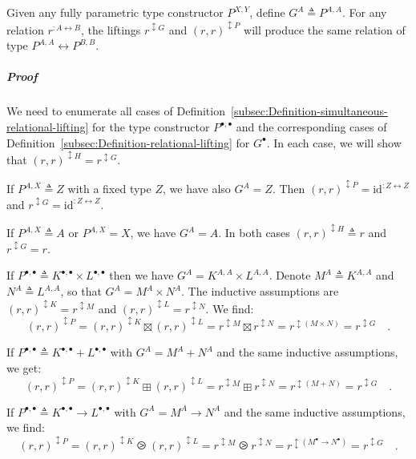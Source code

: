 Given any fully parametric type constructor $P^{X,Y}$, define $G^{A}\triangleq P^{A,A}$.
For any relation $r^{:A\leftrightarrow B}$, the liftings $r^{\updownarrow G}$
and $\left(r,r\right)^{\updownarrow P}$ will produce the same relation
of type $P^{A,A}\leftrightarrow P^{B,B}$.

\subparagraph{Proof}

We need to enumerate all cases of Definition~\ref{subsec:Definition-simultaneous-relational-lifting}
for the type constructor $P^{\bullet,\bullet}$ and the corresponding
cases of Definition~\ref{subsec:Definition-relational-lifting} for
$G^{\bullet}$. In each case, we will show that $(r,r)^{\updownarrow H}=r^{\updownarrow G}$.

If $P^{A,X}\triangleq Z$ with a fixed type $Z$, we have also $G^{A}=Z$.
Then $(r,r)^{\updownarrow P}=\text{id}^{:Z\leftrightarrow Z}$ and
$r^{\updownarrow G}=\text{id}^{:Z\leftrightarrow Z}$.

If $P^{A,X}\triangleq A$ or $P^{A,X}=X$, we have $G^{A}=A$. In
both cases $(r,r)^{\updownarrow H}\triangleq r$ and $r^{\updownarrow G}=r$.

If $P^{\bullet,\bullet}\triangleq K^{\bullet,\bullet}\times L^{\bullet,\bullet}$
then we have $G^{A}=K^{A,A}\times L^{A,A}$. Denote $M^{A}\triangleq K^{A,A}$
and $N^{A}\triangleq L^{A,A}$, so that $G^{A}=M^{A}\times N^{A}$.
The inductive assumptions are $(r,r)^{\updownarrow K}=r^{\updownarrow M}$
and $(r,r)^{\updownarrow L}=r^{\updownarrow N}$. We find:
\[
(r,r)^{\updownarrow P}=(r,r)^{\updownarrow K}\boxtimes(r,r)^{\updownarrow L}=r^{\updownarrow M}\boxtimes r^{\updownarrow N}=r^{\updownarrow(M\times N)}=r^{\updownarrow G}\quad.
\]

If $P^{\bullet,\bullet}\triangleq K^{\bullet,\bullet}+L^{\bullet,\bullet}$
with $G^{A}=M^{A}+N^{A}$ and the same inductive assumptions, we get:
\[
(r,r)^{\updownarrow P}=(r,r)^{\updownarrow K}\boxplus(r,r)^{\updownarrow L}=r^{\updownarrow M}\boxplus r^{\updownarrow N}=r^{\updownarrow(M+N)}=r^{\updownarrow G}\quad.
\]

If $P^{\bullet,\bullet}\triangleq K^{\bullet,\bullet}\rightarrow L^{\bullet,\bullet}$
with $G^{A}=M^{A}\rightarrow N^{A}$ and the same inductive assumptions,
we find: 
\[
(r,r)^{\updownarrow P}=(r,r)^{\updownarrow K}\ogreaterthan(r,r)^{\updownarrow L}=r^{\updownarrow M}\ogreaterthan r^{\updownarrow N}=r^{\updownarrow(M^{\bullet}\rightarrow N^{\bullet})}=r^{\updownarrow G}\quad.
\]

